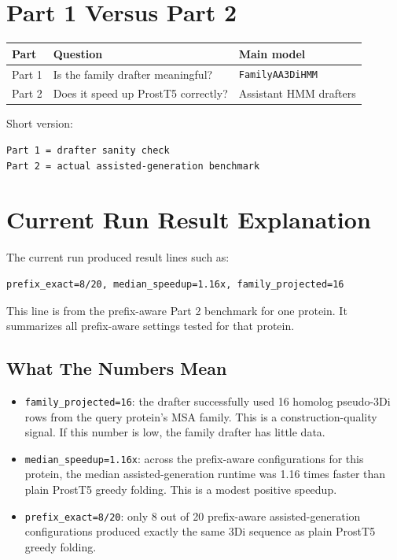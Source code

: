 \documentclass[11pt,a4paper]{article}
\begin{document}
\section{Part 1 Versus Part 2}

\begin{center}
\begin{tabular}{lll}
\toprule
Part & Question & Main model \\
\midrule
Part 1 & Is the family drafter meaningful? & \texttt{FamilyAA3DiHMM} \\
Part 2 & Does it speed up ProstT5 correctly? & Assistant HMM drafters \\
\bottomrule
\end{tabular}
\end{center}

Short version:

\begin{verbatim}
Part 1 = drafter sanity check
Part 2 = actual assisted-generation benchmark
\end{verbatim}

\section{Current Run Result Explanation}

The current run produced result lines such as:

\begin{verbatim}
prefix_exact=8/20, median_speedup=1.16x, family_projected=16
\end{verbatim}

This line is from the prefix-aware Part 2 benchmark for one protein. It summarizes all prefix-aware settings tested for that protein.

\subsection{What The Numbers Mean}

\begin{itemize}
  \item \texttt{family\_projected=16}: the drafter successfully used 16 homolog pseudo-3Di rows from the query protein's MSA family. This is a construction-quality signal. If this number is low, the family drafter has little data.
  \item \texttt{median\_speedup=1.16x}: across the prefix-aware configurations for this protein, the median assisted-generation runtime was 1.16 times faster than plain ProstT5 greedy folding. This is a modest positive speedup.
  \item \texttt{prefix\_exact=8/20}: only 8 out of 20 prefix-aware assisted-generation configurations produced exactly the same 3Di sequence as plain ProstT5 greedy folding.
\end{itemize}
\end{document}
